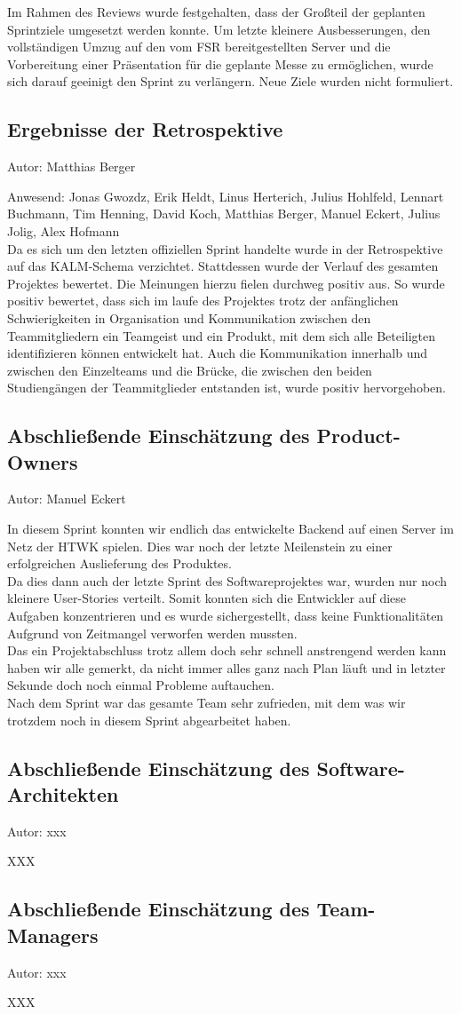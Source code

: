 Im Rahmen des Reviews wurde festgehalten, dass der Großteil der geplanten  Sprintziele umgesetzt werden konnte. Um letzte kleinere Ausbesserungen, den vollständigen Umzug auf den vom FSR bereitgestellten Server und die Vorbereitung einer Präsentation für die geplante Messe zu ermöglichen, wurde sich darauf geeinigt den Sprint zu verlängern. Neue Ziele wurden nicht formuliert.

\subsection{Ergebnisse der Retrospektive}
{\small Autor: Matthias Berger}

Anwesend: Jonas Gwozdz, Erik Heldt, Linus Herterich, Julius Hohlfeld, Lennart Buchmann, Tim Henning, David Koch, Matthias Berger, Manuel Eckert, Julius Jolig, Alex Hofmann\\

Da es sich um den letzten offiziellen Sprint handelte wurde in der Retrospektive auf das KALM-Schema verzichtet. Stattdessen wurde der Verlauf des gesamten Projektes bewertet. Die Meinungen hierzu fielen durchweg positiv aus. So wurde  positiv bewertet, dass sich im laufe des Projektes trotz der anfänglichen Schwierigkeiten in Organisation und Kommunikation zwischen den Teammitgliedern ein Teamgeist und ein Produkt, mit dem sich alle Beteiligten identifizieren können entwickelt hat. Auch die Kommunikation innerhalb und zwischen den Einzelteams und die Brücke, die zwischen den beiden Studiengängen der Teammitglieder entstanden ist, wurde positiv hervorgehoben.

\subsection{Abschließende Einschätzung des Product-Owners}
{\small Autor: Manuel Eckert}

In diesem Sprint konnten wir endlich das entwickelte Backend auf einen Server im Netz der HTWK spielen. Dies war noch der letzte Meilenstein zu einer erfolgreichen Auslieferung des Produktes. \\
Da dies dann auch der letzte Sprint des Softwareprojektes war, wurden nur noch kleinere User-Stories verteilt. Somit konnten sich die Entwickler auf diese Aufgaben konzentrieren und es wurde sichergestellt, dass keine Funktionalitäten Aufgrund von Zeitmangel verworfen werden mussten. \\
Das ein Projektabschluss trotz allem doch sehr schnell anstrengend werden kann haben wir alle gemerkt, da nicht immer alles ganz nach Plan läuft und in letzter Sekunde doch noch einmal Probleme auftauchen. \\
Nach dem Sprint war das gesamte Team sehr zufrieden, mit dem was wir trotzdem noch in diesem Sprint abgearbeitet haben. \\ 

\subsection{Abschließende Einschätzung des Software-Architekten}
{\small Autor: xxx}

XXX

\subsection{Abschließende Einschätzung des Team-Managers}
{\small Autor: xxx}

XXX